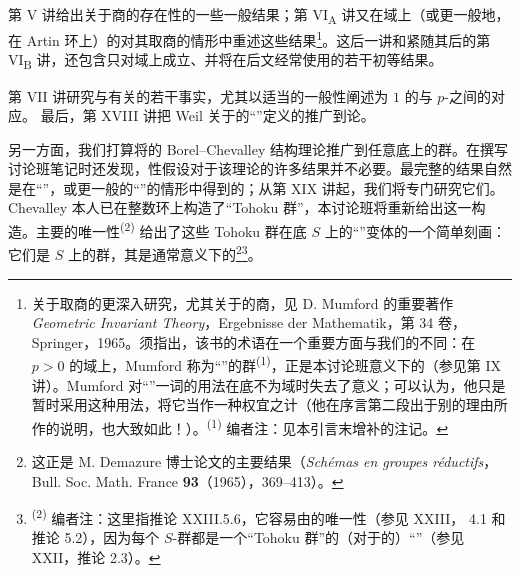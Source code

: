 第 V 讲给出关于商的存在性的一些一般结果；第 VI\textsubscript{A} 讲又在域上（或更一般地，在 Artin 环上）的对其取商的情形中重述这些结果\footnote{关于取商的更深入研究，尤其关于的商，见 D. Mumford 的重要著作 \emph{Geometric Invariant Theory}，Ergebnisse der Mathematik，第 34 卷，Springer，1965。须指出，该书的术语在一个重要方面与我们的不同：在 $p>0$ 的域上，Mumford 称为“”的群\textsuperscript{(1)}，正是本讨论班意义下的（参见第 IX 讲）。Mumford 对“”一词的用法在底不为域时失去了意义；可以认为，他只是暂时采用这种用法，将它当作一种权宜之计（他在序言第二段出于别的理由所作的说明，也大致如此！）。\textsuperscript{(1)} 编者注：见本引言末增补的注记。}。这后一讲和紧随其后的第 VI\textsubscript{B} 讲，还包含只对域上成立、并将在后文经常使用的若干初等结果。

第 VII 讲研究与有关的若干事实，尤其以适当的一般性阐述为 $1$ 的与 $p$-之间的对应。
最后，第 XVIII 讲把 Weil 关于的“”定义的推广到论。

另一方面，我们打算将的 Borel--Chevalley 结构理论推广到任意底上的群。在撰写讨论班笔记时还发现，性假设对于该理论的许多结果并不必要。最完整的结果自然是在“”，或更一般的“”的情形中得到的；从第 XIX 讲起，我们将专门研究它们。Chevalley 本人已在整数环上构造了“Tohoku 群”，本讨论班将重新给出这一构造。主要的唯一性\textsuperscript{(2)} 给出了这些 Tohoku 群在底 $S$ 上的“”变体的一个简单刻画：它们是 $S$ 上的群，其是通常意义下的\footnote{这正是 M. Demazure 博士论文的主要结果（\emph{Schémas en groupes réductifs}，Bull. Soc. Math. France \textbf{93}（1965），369--413）。}\footnote{\textsuperscript{(2)} 编者注：这里指推论 XXIII.5.6，它容易由的唯一性（参见 XXIII， 4.1 和推论 5.2），因为每个 $S$-群都是一个“Tohoku 群”的（对于的）“”（参见 XXII，推论 2.3）。}。

